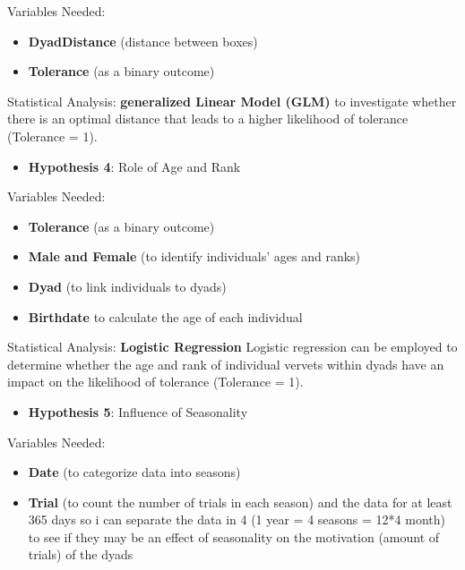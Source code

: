 \documentclass[
]{article}
\providecommand{\tightlist}{%
  \setlength{\itemsep}{0pt}\setlength{\parskip}{0pt}}
\begin{document}
Variables Needed:

\begin{itemize}
\tightlist
\item
  \textbf{DyadDistance} (distance between boxes)
\item
  \textbf{Tolerance} (as a binary outcome)
\end{itemize}

Statistical Analysis: \textbf{generalized Linear Model (GLM)} to
investigate whether there is an optimal distance that leads to a higher
likelihood of tolerance (Tolerance = 1).

\begin{itemize}
\tightlist
\item
  \textbf{Hypothesis 4}: Role of Age and Rank
\end{itemize}

Variables Needed:

\begin{itemize}
\tightlist
\item
  \textbf{Tolerance} (as a binary outcome)
\item
  \textbf{Male and Female} (to identify individuals' ages and ranks)
\item
  \textbf{Dyad} (to link individuals to dyads)
\item
  \textbf{Birthdate} to calculate the age of each individual
\end{itemize}

Statistical Analysis: \textbf{Logistic Regression} Logistic regression
can be employed to determine whether the age and rank of individual
vervets within dyads have an impact on the likelihood of tolerance
(Tolerance = 1).

\begin{itemize}
\tightlist
\item
  \textbf{Hypothesis 5}: Influence of Seasonality
\end{itemize}

Variables Needed:

\begin{itemize}
\tightlist
\item
  \textbf{Date} (to categorize data into seasons)
\item
  \textbf{Trial} (to count the number of trials in each season) and the
  data for at least 365 days so i can separate the data in 4 (1 year = 4
  seasons = 12*4 month) to see if they may be an effect of seasonality
  on the motivation (amount of trials) of the dyads
\end{itemize}
\end{document}
